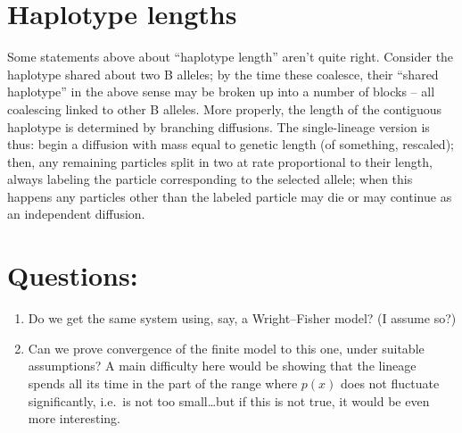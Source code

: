 \documentclass{article}
\begin{document}
\section{Haplotype lengths}

Some statements above about ``haplotype length'' aren't quite right.
Consider the haplotype shared about two B alleles;
by the time these coalesce, their ``shared haplotype'' in the above sense may be broken up into a number of blocks --
all coalescing linked to other B alleles.
More properly, the length of the contiguous haplotype
is determined by branching diffusions.
The single-lineage version is thus:
begin a diffusion with mass equal to genetic length (of something, rescaled);
then, any remaining particles split in two at rate proportional to their length,
always labeling the particle corresponding to the selected allele;
when this happens any particles other than the labeled particle may die
or may continue as an independent diffusion.



\section{Questions:} 
\begin{enumerate}

    \item Do we get the same system using, say, a Wright--Fisher model?  (I assume so?)

    \item Can we prove convergence of the finite model to this one, under suitable assumptions?  A main difficulty here would be showing that the lineage spends all its time in the part of the range where $p(x)$ does not fluctuate significantly, i.e.\ is not too small\ldots but if this is not true, it would be even more interesting.

\end{enumerate}
\end{document}
